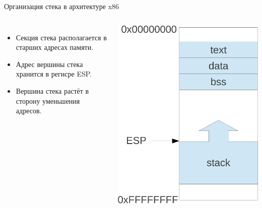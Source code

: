 \documentclass[utf8, russian]{beamer}
\begin{document}
    \begin{frame}{Организация стека в архитектуре x86}
        \begin{columns}
        \begin{itemize}
            \item Секция стека располагается в старших адресах памяти. 
            \item Адрес вершины стека хранится в регисре ESP.
            \item Вершина стека растёт в сторону уменьшения адресов. 
        \end{itemize}
            \includegraphics[width=\linewidth]{fig/segments.pdf}
        \end{columns}
    \end{frame}
\end{document}

